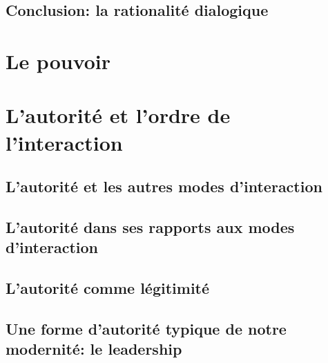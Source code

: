 \documentclass[11pt]{article} %
\begin{document}
	\subsection{Conclusion: la rationalité dialogique}

	

\section{Le pouvoir}
\section{L'autorité et l'ordre de l'interaction}
	\subsection{L'autorité et les autres modes d'interaction}
	\subsection{L'autorité dans ses rapports aux modes d'interaction}
	\subsection{L'autorité comme légitimité}
	\subsection{Une forme d'autorité typique de notre modernité: le leadership}
	

	
	
\end{document}
